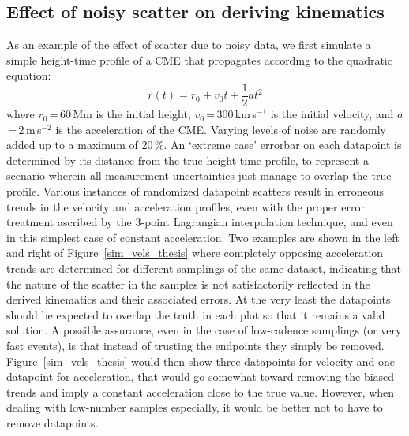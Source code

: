 \documentclass[structabstract]{aa}
\begin{document}
\subsection{Effect of noisy scatter on deriving kinematics}
\label{subsect:test_lagrange_const}


As an example of the effect of scatter due to noisy data, we first simulate a simple height-time profile of a CME that propagates according to the quadratic equation:
\begin{equation}
\label{eqn:const_a}
r(t) = r_0 + v_0 t + \frac{1}{2}a t^2
\end{equation}
where $r_0$\,=\,60\,Mm is the initial height, $v_0$\,=\,300\,km\,s$^{-1}$ is the initial velocity, and $a$\,=\,2\,m\,s$^{-2}$ is the acceleration of the CME. Varying levels of noise are randomly added up to a maximum of 20\,\%. An `extreme case' errorbar on each datapoint is determined by its distance from the true height-time profile, to represent a scenario wherein all measurement uncertainties just manage to overlap the true profile. Various instances of randomized datapoint scatters result in erroneous trends in the velocity and acceleration profiles, even with the proper error treatment ascribed by the 3-point Lagrangian interpolation technique, and even in this simplest case of constant acceleration. Two examples are shown in the left and right of Figure~\ref{sim_vels_thesis} where completely opposing acceleration trends are determined for different samplings of the same dataset, indicating that the nature of the scatter in the samples is not satisfactorily reflected in the derived kinematics and their associated errors. At the very least the datapoints should be expected to overlap the truth in each plot so that it remains a valid solution. A possible assurance, even in the case of low-cadence samplings (or very fast events), is that instead of trusting the endpoints they simply be removed. Figure~\ref{sim_vels_thesis} would then show three datapoints for velocity and one datapoint for acceleration, that would go somewhat toward removing the biased trends and imply a constant acceleration close to the true value. However, when dealing with low-number samples especially, it would be better not to have to remove datapoints.
\end{document}
